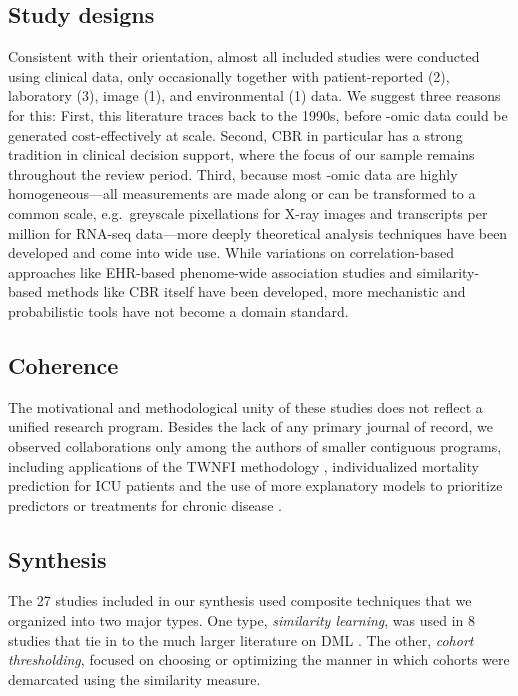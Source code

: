 \documentclass[sn-mathphys,Numbered,pdflatex]{sn-jnl}
\theoremstyle{remark}
\theoremstyle{definition}
\begin{document}
\subsection{Study designs}\label{study-designs}

Consistent with their orientation, almost all included studies were
conducted using clinical data, only occasionally together with
patient-reported (2), laboratory (3), image (1), and environmental (1)
data. We suggest three reasons for this: First, this literature traces
back to the 1990s, before -omic data could be generated cost-effectively
at scale. Second, CBR in particular has a strong tradition in clinical
decision support, where the focus of our sample remains throughout the
review period. Third, because most -omic data are highly
homogeneous---all measurements are made along or can be transformed to a
common scale, e.g.~greyscale pixellations for X-ray images and
transcripts per million for RNA-seq data---more deeply theoretical
analysis techniques have been developed and come into wide use. While
variations on correlation-based approaches like EHR-based phenome-wide
association studies and similarity-based methods like CBR itself have
been developed, more mechanistic and probabilistic tools have not become
a domain standard.

\subsection{Coherence}\label{coherence}

The motivational and methodological unity of these studies does not
reflect a unified research program. Besides the lack of any primary
journal of record, we observed collaborations only among the authors of
smaller contiguous programs, including applications of the TWNFI
methodology \citep{Song2006, Verma2015}, individualized mortality
prediction for ICU patients \citep{Lee2015, Lee2017} and the use of more
explanatory models to prioritize predictors or treatments for chronic
disease \citep{Ng2015, Tang2021, Ng2021}.

\subsection{Synthesis}\label{synthesis-1}

The 27 studies included in our synthesis used composite techniques that
we organized into two major types. One type, \emph{similarity learning},
was used in 8 studies that tie in to the much larger literature on DML
\citep{Yang2006}. The other, \emph{cohort thresholding}, focused on
choosing or optimizing the manner in which cohorts were demarcated using
the similarity measure.
\end{document}
